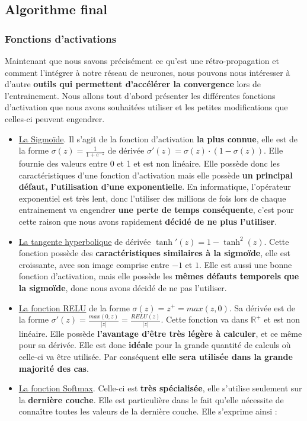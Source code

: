 \documentclass[12pt,a4paper]{extarticle}
\begin{document}
\subsection{Algorithme final} 

\subsubsection{Fonctions d'activations}
Maintenant que nous savons précisément ce qu'est une rétro-propagation et comment l'intégrer à notre réseau de neurones, nous pouvons nous intéresser à d'autre \textbf{outils qui permettent d'accélérer la convergence} lors de l'entrainement.
Nous allons tout d'abord présenter les différentes fonctions d'activation que nous avons souhaitées utiliser et les petites modifications que celles-ci peuvent engendrer.
\begin{itemize}
\item \underline{La Sigmoïde}. Il s'agit de la fonction d'activation \textbf{la plus connue}, elle est de la forme $\sigma(z)=\frac{1}{1+e^{-z}}$ de dérivée $\sigma'(z)=\sigma(z)\cdot (1-\sigma(z))$. Elle fournie des valeurs entre 0 et 1 et est non linéaire. Elle possède donc les caractéristiques d'une fonction d'activation mais elle possède \textbf{un principal défaut, l'utilisation d'une exponentielle}. En informatique, l'opérateur exponentiel est très lent, donc l'utiliser des millions de fois lors de chaque entrainement va engendrer \textbf{une perte de temps conséquente}, c'est pour cette raison que nous avons rapidement \textbf{décidé de ne plus l'utiliser}.
\item \underline{La tangente hyperbolique} de dérivée $\tanh'(z) = 1 - \tanh^2(z)$. Cette fonction possède des \textbf{caractéristiques similaires à la sigmoïde}, elle est croissante, avec son image comprise entre $-1$ et $1$. Elle est aussi une bonne fonction d'activation, mais elle possède les \textbf{mêmes défauts temporels que la sigmoïde}, donc nous avons décidé de ne pas l'utiliser.
\item \underline{La fonction RELU} de la forme $\sigma(z)=z^+=max(z,0)$. Sa dérivée est de la forme $\sigma'(z)=\frac{max(0,z)}{|z|}=\frac{RELU(z)}{|z|}$. Cette fonction va dans $\mathbb R^+$ et est non linéaire. Elle possède \textbf{l'avantage d'être très légère à calculer}, et ce même pour sa dérivée. Elle est donc \textbf{idéale} pour la grande quantité de calculs où celle-ci va être utilisée. Par conséquent \textbf{elle sera utilisée dans la grande majorité des cas}.
\item \underline{La fonction Softmax}. Celle-ci est \textbf{très spécialisée}, elle s'utilise seulement sur la \textbf{dernière couche}. Elle est particulière dans le fait qu'elle nécessite de connaître toutes les valeurs de la dernière couche. Elle s'exprime ainsi :

\end{itemize}
\end{document}
